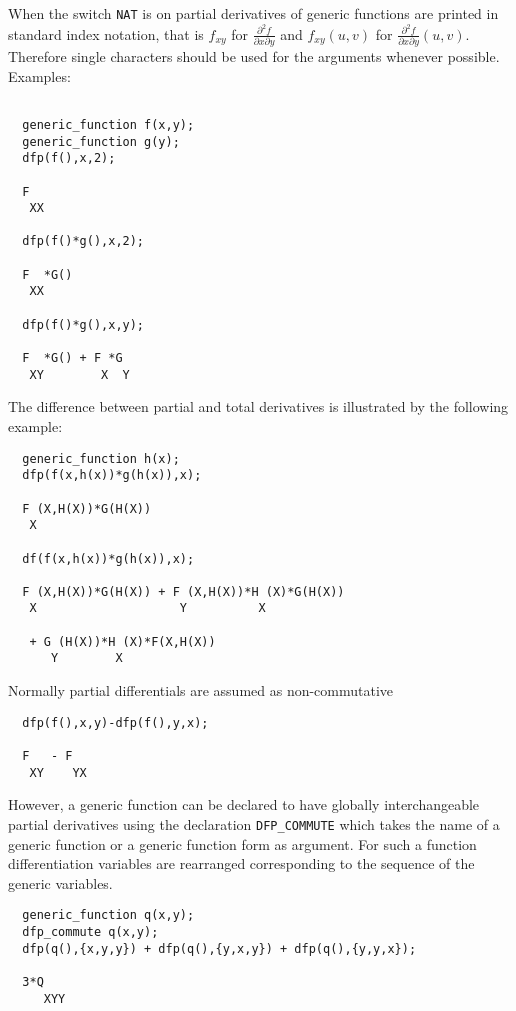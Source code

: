 When the switch {\tt NAT} is on partial derivatives of generic
functions are printed in standard index notation, that is
$f_{xy}$ for $\frac{\partial ^2 f}{\partial x \partial y}$
and $f_{xy}(u,v)$ for $\frac{\partial ^2 f}{\partial x \partial y}(u,v)$.
Therefore single characters should be used for the arguments
whenever possible. Examples:

\begin{verbatim}

  generic_function f(x,y);
  generic_function g(y);
  dfp(f(),x,2);

  F
   XX

  dfp(f()*g(),x,2);

  F  *G()
   XX

  dfp(f()*g(),x,y);

  F  *G() + F *G
   XY        X  Y

\end{verbatim}

The difference between partial and total derivatives is
illustrated by the following example:

\begin{verbatim}
  generic_function h(x);
  dfp(f(x,h(x))*g(h(x)),x);

  F (X,H(X))*G(H(X))
   X

  df(f(x,h(x))*g(h(x)),x);

  F (X,H(X))*G(H(X)) + F (X,H(X))*H (X)*G(H(X))
   X                    Y          X

   + G (H(X))*H (X)*F(X,H(X))
      Y        X
\end{verbatim}

Normally partial differentials are assumed as non-commutative

\begin{verbatim}
  dfp(f(),x,y)-dfp(f(),y,x);

  F   - F
   XY    YX
\end{verbatim}

However, a generic function can be declared to have globally
interchangeable partial derivatives using the declaration
{\tt DFP\_COMMUTE}
which takes the name of a generic function or a generic function
form as argument. For such a function differentiation variables are
rearranged corresponding to the sequence of the generic variables.

\begin{verbatim}
  generic_function q(x,y);
  dfp_commute q(x,y);
  dfp(q(),{x,y,y}) + dfp(q(),{y,x,y}) + dfp(q(),{y,y,x});

  3*Q
     XYY
\end{verbatim}

